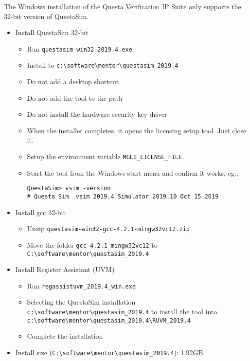 \documentclass[10pt,twoside]{article}
\begin{document}
The Windows installation of the Questa Verification IP Suite only supports
the 32-bit version of QuestaSim.
%
\begin{itemize}
\item Install QuestaSim 32-bit
%
\begin{itemize}
\item Run \verb+questasim-win32-2019.4.exe+
\item Install to \verb+c:\software\mentor\questasim_2019.4+
\item Do not add a desktop shortcut
\item Do not add the tool to the path
\item Do not install the hardware security key driver
\item When the installer completes, it opens the licensing setup tool.
Just close it.
\item Setup the environment variable \verb+MGLS_LICENSE_FILE+.
\item Start the tool from the Windows start menu and confirm it works, eg.,
\begin{verbatim}
QuestaSim> vsim -version
# Questa Sim  vsim 2019.4 Simulator 2019.10 Oct 15 2019
\end{verbatim}
\end{itemize}
%
\item Install gcc 32-bit
%
\begin{itemize}
\item Unzip \verb+questasim-win32-gcc-4.2.1-mingw32vc12.zip+
\item Move the folder \verb+gcc-4.2.1-mingw32vc12+ to \verb+C:\software\mentor\questasim_2019.4+
\end{itemize}
%
\item Install Register Assistant (UVM)
\begin{itemize}
\item Run \verb+regassistuvm_2019.4_win.exe+
\item Selecting the QuestaSim installation \verb+c:\software\mentor\questasim_2019.4+
to install the tool into \verb+c:\software\mentor\questasim_2019.4\RUVM_2019.4+
\item Complete the installation
\end{itemize}
\item Install size (\verb+C:\software\mentor\questasim_2019.4+): 1.92GB
\end{itemize}
\end{document}
